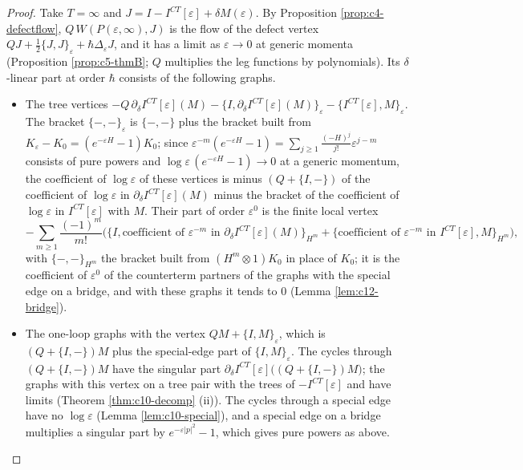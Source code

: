 \begin{proof}
Take $T=\infty$ and $J=I-I^{CT}[\varepsilon]+\delta M(\varepsilon)$. By Proposition \ref{prop:c4-defectflow}, $Q\,W(P(\varepsilon,\infty),J)$ is the flow of the defect vertex $QJ+\tfrac12\{J,J\}_\varepsilon+\hbar\Delta_\varepsilon J$, and it has a limit as $\varepsilon\to0$ at generic momenta (Proposition \ref{prop:c5-thmB}; $Q$ multiplies the leg functions by polynomials). Its $\delta$-linear part at order $\hbar$ consists of the following graphs.
\begin{itemize}
\item The tree vertices $-Q\,\partial_\delta I^{CT}[\varepsilon](M)-\{I,\partial_\delta I^{CT}[\varepsilon](M)\}_\varepsilon-\{I^{CT}[\varepsilon],M\}_\varepsilon$. The bracket $\{-,-\}_\varepsilon$ is $\{-,-\}$ plus the bracket built from $K_\varepsilon-K_0=(e^{-\varepsilon H}-1)K_0$; since $\varepsilon^{-m}(e^{-\varepsilon H}-1)=\sum_{j\ge1}\frac{(-H)^j}{j!}\varepsilon^{j-m}$ consists of pure powers and $\log\varepsilon\,(e^{-\varepsilon H}-1)\to0$ at a generic momentum, the coefficient of $\log\varepsilon$ of these vertices is minus $(Q+\{I,-\})$ of the coefficient of $\log\varepsilon$ in $\partial_\delta I^{CT}[\varepsilon](M)$ minus the bracket of the coefficient of $\log\varepsilon$ in $I^{CT}[\varepsilon]$ with $M$. Their part of order $\varepsilon^0$ is the finite local vertex
\begin{equation}
-\sum_{m\ge1}\frac{(-1)^m}{m!}\Big(\big\{I,\text{coefficient of }\varepsilon^{-m}\text{ in }\partial_\delta I^{CT}[\varepsilon](M)\big\}_{H^m}+\big\{\text{coefficient of }\varepsilon^{-m}\text{ in }I^{CT}[\varepsilon],M\big\}_{H^m}\Big),
\label{eq:c10-finitesp}
\end{equation}
with $\{-,-\}_{H^m}$ the bracket built from $(H^m\otimes1)K_0$ in place of $K_0$; it is the coefficient of $\varepsilon^0$ of the counterterm partners of the graphs with the special edge on a bridge, and with these graphs it tends to $0$ (Lemma \ref{lem:c12-bridge}).
\item The one-loop graphs with the vertex $QM+\{I,M\}_\varepsilon$, which is $(Q+\{I,-\})M$ plus the special-edge part of $\{I,M\}_\varepsilon$. The cycles through $(Q+\{I,-\})M$ have the singular part $\partial_\delta I^{CT}[\varepsilon]\big((Q+\{I,-\})M\big)$; the graphs with this vertex on a tree pair with the trees of $-I^{CT}[\varepsilon]$ and have limits (Theorem \ref{thm:c10-decomp} (ii)). The cycles through a special edge have no $\log\varepsilon$ (Lemma \ref{lem:c10-special}), and a special edge on a bridge multiplies a singular part by $e^{-\varepsilon|p|^2}-1$, which gives pure powers as above.

\end{itemize}
\end{proof}
